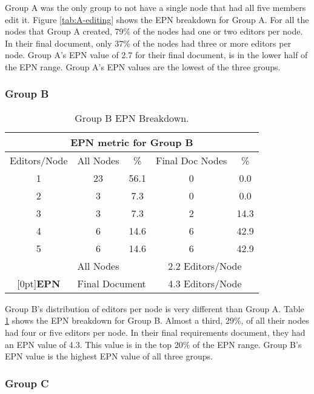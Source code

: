 Group A was the only group to not have a single node that had all five
members edit it.  Figure \ref{tab:A-editing} shows the EPN breakdown for
Group A.  For all the nodes that Group A created, 79\% of the nodes had
one or two editors per node.  In their final document, only 37\% of the
nodes had three or more editors per node.  Group A's EPN value of 2.7 for
their final document, is in the lower half of the EPN range.  Group A's
EPN values are the lowest of the three groups.

\subsubsection{Group B}

\small
\begin{table}[htb]
  \caption{Group B EPN Breakdown.}
  \begin{center}
    \begin{tabular}{|c|c|c|c|c|}
      \hline
      \multicolumn{5}{|c|}{\rule[-3mm]{0mm}{8mm}\bf EPN metric for Group B}\\ \hline
      Editors/Node&All Nodes&\%&Final Doc Nodes&\%\\ \hline
      \hline
      1&23&56.1&0&0.0\\ \hline
      2&3&7.3&0&0.0\\ \hline
      3&3&7.3&2&14.3\\ \hline
      4&6&14.6&6&42.9\\\hline 
      5&6&14.6&6&42.9\\\hline
      \hline
      &\multicolumn{2}{|l|}{All Nodes}&\multicolumn{2}{|c|}{2.2
      Editors/Node}\\ \cline{2-5} 
      \raisebox{1.5ex}[0pt]{\bf EPN}&\multicolumn{2}{|l|}{Final
      Document}&\multicolumn{2}{|c|}{4.3 Editors/Node}\\\hline
    \end{tabular}
  \end{center}
  \label{tab:Ku-editing}
\end{table}
\normalsize

Group B's distribution of editors per node is very different than Group A.
Table \ref{tab:Ku-editing} shows the EPN breakdown for Group B.  Almost a
third, 29\%, of all their nodes had four or five editors per node.  In
their final requirements document, they had an EPN value of 4.3.  This
value is in the top 20\% of the EPN range.  Group B's EPN value is the
highest EPN value of all three groups.

\subsubsection{Group C}

